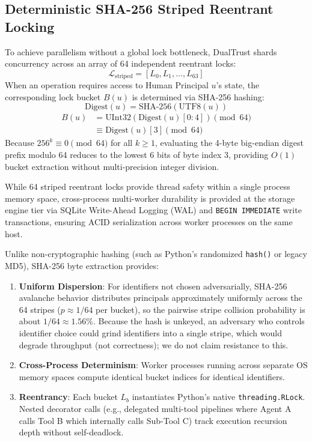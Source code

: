 \documentclass[manuscript, screen, review]{jair}
\begin{document}
\subsection{Deterministic SHA-256 Striped Reentrant Locking}
To achieve parallelism without a global lock bottleneck, DualTrust shards concurrency across an array of 64 independent reentrant locks:
\begin{equation}
\mathcal{L}_{\text{striped}} = [L_0, L_1, \dots, L_{63}]
\end{equation}
When an operation requires access to Human Principal $u$'s state, the corresponding lock bucket $B(u)$ is determined via SHA-256 hashing:
\begin{equation}
\text{Digest}(u) = \text{SHA-256}(\text{UTF8}(u))
\end{equation}
\begin{equation}
\begin{aligned}
B(u) &= \text{UInt32}(\text{Digest}(u)[0:4]) \pmod{64} \\
&\equiv \text{Digest}(u)[3] \pmod{64}
\end{aligned}
\label{eq:striped_hash}
\end{equation}
Because $256^k \equiv 0 \pmod{64}$ for all $k \ge 1$, evaluating the 4-byte big-endian digest prefix modulo 64 reduces to the lowest 6 bits of byte index 3, providing $O(1)$ bucket extraction without multi-precision integer division.

While 64 striped reentrant locks provide thread safety within a single process memory space, cross-process multi-worker durability is provided at the storage engine tier via SQLite Write-Ahead Logging (WAL) and \texttt{BEGIN IMMEDIATE} write transactions, ensuring ACID serialization across worker processes on the same host.

Unlike non-cryptographic hashing (such as Python's randomized \texttt{hash()} or legacy MD5), SHA-256 byte extraction provides:
\begin{enumerate}[leftmargin=12pt, topsep=2pt, itemsep=1pt]
\item \textbf{Uniform Dispersion}: For identifiers not chosen adversarially, SHA-256 avalanche behavior distributes principals approximately uniformly across the 64 stripes ($p \approx 1/64$ per bucket), so the pairwise stripe collision probability is about $1/64 \approx 1.56\%$. Because the hash is unkeyed, an adversary who controls identifier choice could grind identifiers into a single stripe, which would degrade throughput (not correctness); we do not claim resistance to this.
\item \textbf{Cross-Process Determinism}: Worker processes running across separate OS memory spaces compute identical bucket indices for identical identifiers.
\item \textbf{Reentrancy}: Each bucket $L_b$ instantiates Python's native \texttt{threading.RLock}. Nested decorator calls (e.g., delegated multi-tool pipelines where Agent A calls Tool B which internally calls Sub-Tool C) track execution recursion depth without self-deadlock.
\end{enumerate}
\end{document}
